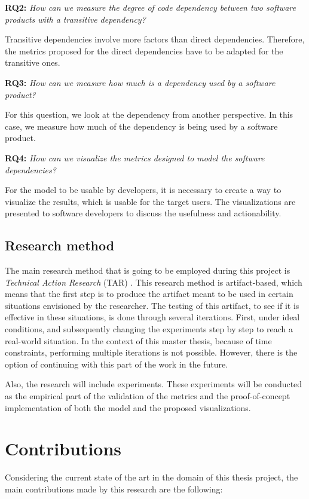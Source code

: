 \blankl
\textbf{RQ2:} \textit{How can we measure the degree of code dependency between two software products with a transitive dependency?}

\blankls
Transitive dependencies involve more factors than direct dependencies. Therefore, the metrics proposed for the direct dependencies have to be adapted for the transitive ones.

\blankl
\textbf{RQ3:} \textit{How can we measure how much is a dependency used by a software product?}

\blankls
For this question, we look at the dependency from another perspective. In this case, we measure how much of the dependency is being used by a software product.

\blankl
\textbf{RQ4:} \textit{How can we visualize the metrics designed to model the software dependencies?}

\blankls
For the model to be usable by developers, it is necessary to create a way to visualize the results, which is usable for the target users. The visualizations are presented to software developers to discuss the usefulness and actionability.

\subsection{Research method}
The main research method that is going to be employed during this project is \textit{Technical Action Research} (TAR) \cite{wieringa2012technical}.
This research method is artifact-based, which means that the first step is to produce the artifact meant to be used in certain situations envisioned by the researcher. The testing of this artifact, to see if it is effective in these situations, is done through several iterations. First, under ideal conditions, and subsequently changing the experiments step by step to reach a real-world situation. In the context of this master thesis, because of time constraints, performing multiple iterations is not possible. However, there is the option of continuing with this part of the work in the future.

\blankl
Also, the research will include experiments. These experiments will be conducted as the empirical part of the validation of the metrics and the proof-of-concept implementation of both the model and the proposed visualizations.

\section{Contributions}
Considering the current state of the art in the domain of this thesis project, the main contributions made by this research are the following:

